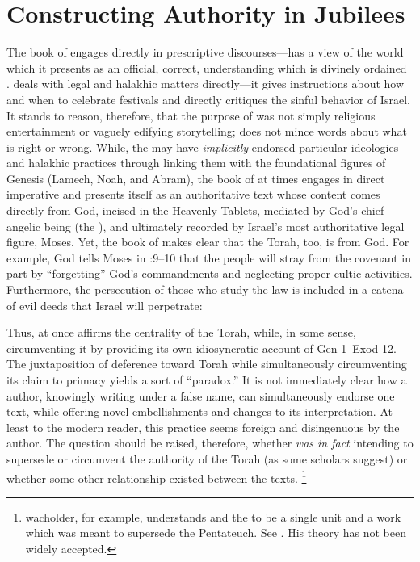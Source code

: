 
\section{Constructing Authority in Jubilees}

The book of \jub engages directly in prescriptive discourses---\jub has a view of the world which it presents as an official, correct, understanding which is divinely ordained . \jub deals with legal and halakhic matters directly---it gives instructions about how and when to celebrate festivals and directly critiques the sinful behavior of Israel. It stands to reason, therefore, that the purpose of \jub was not simply religious entertainment or vaguely edifying storytelling; \jub does not mince words about what is right or wrong. While, the \ga may have \emph{implicitly} endorsed particular ideologies and halakhic practices through linking them with the foundational figures of Genesis (Lamech, Noah, and Abram), the book of \jub at times engages in direct imperative and presents itself as an authoritative text whose content comes directly from God, incised in the Heavenly Tablets, mediated by God's chief angelic being (the \ap), and ultimately recorded by Israel's most authoritative legal figure, Moses. Yet, the book of \jub makes clear that the Torah, too, is from God. For example, God tells Moses in :9--10 that the people will stray from the covenant in part by ``forgetting'' God's commandments and neglecting proper cultic activities. Furthermore, the persecution of those who study the law is included in a catena of evil deeds that Israel will perpetrate:



\noindent
Thus, \jub at once affirms the centrality of the Torah, while, in some sense, circumventing it by providing its own idiosyncratic account of Gen 1--Exod 12. The juxtaposition of deference toward Torah while simultaneously circumventing its claim to primacy yields a sort of ``\psgraphical paradox.'' It is not immediately clear how a \psgraphical author, knowingly writing under a false name, can simultaneously endorse one text, while offering novel embellishments and changes to its interpretation. At least to the modern reader, this practice seems foreign and disingenuous by the \psgraphical author. The question should be raised, therefore, whether \jub \emph{was in fact} intending to supersede or circumvent the authority of the Torah (as some scholars suggest) or whether some other relationship existed between the texts.%
    \footnote{wacholder, for example, understands \jub and the \templescroll to be a single unit and a work which was meant to supersede the Pentateuch. See \cite{wacholder_kampen-etal1997}. His theory has not been widely accepted.}

